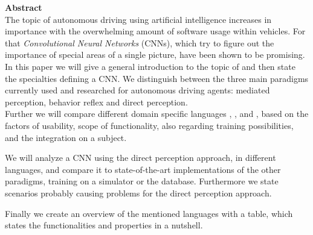 {\bf\Large Abstract} \\ [1em]
The topic of autonomous driving using artificial intelligence increases in importance with the overwhelming amount of software usage within vehicles. For that \textit{Convolutional Neural Networks} (CNNs), which try to figure out the importance of special areas of a single picture, have been shown to be promising. \\
In this paper we will give a general introduction to the topic of \nns and then state the specialties defining a CNN.
We distinguish between the three main paradigms currently used and researched for autonomous driving agents: mediated perception, behavior reflex and direct perception.\\
Further we will compare different domain specific languages \cnnarch, \caffe, \caffetwo and \mxnet, based on the factors of usability, scope of functionality, also regarding training possibilities, and the integration on a subject.

We will analyze a CNN using the direct perception approach, in different languages, and compare it to state-of-the-art implementations of the other paradigms, training on a simulator \torcs or the \kitti database. Furthermore we state scenarios probably causing problems for the direct perception approach. 

Finally we create an overview of the mentioned languages with a table, which states the functionalities and properties in a nutshell.
\cleardoublepage
